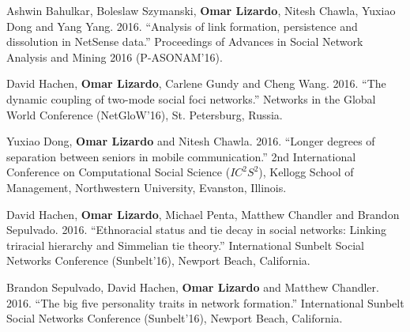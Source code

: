 \ind Ashwin Bahulkar, Boleslaw Szymanski, {\bf Omar Lizardo}, Nitesh Chawla, Yuxiao Dong and Yang Yang.	2016. ``Analysis of link formation, persistence and dissolution in NetSense data.'' Proceedings of Advances in Social Network Analysis and Mining 2016 (P-ASONAM'16).

\ind David Hachen, {\bf Omar Lizardo}, Carlene Gundy and Cheng Wang. 2016. ``The dynamic coupling of two-mode social foci networks.'' Networks in the Global World Conference (NetGloW'16), St. Petersburg, Russia. 

\ind Yuxiao Dong, {\bf Omar Lizardo} and Nitesh Chawla. 2016. ``Longer degrees of separation between seniors in mobile communication.'' 2nd International Conference on Computational Social Science ($IC^2S^2$), Kellogg School of Management, Northwestern University, Evanston, Illinois. 

\ind David Hachen, {\bf Omar Lizardo}, Michael Penta, Matthew Chandler and Brandon Sepulvado. 2016. ``Ethnoracial status and tie decay in social networks: Linking triracial hierarchy and Simmelian tie theory.'' International Sunbelt Social Networks Conference (Sunbelt'16), Newport Beach, California.

\ind Brandon Sepulvado, David Hachen, {\bf Omar Lizardo} and Matthew Chandler. 2016. ``The big five personality traits in network formation.'' International Sunbelt Social Networks Conference (Sunbelt'16), Newport Beach, California.